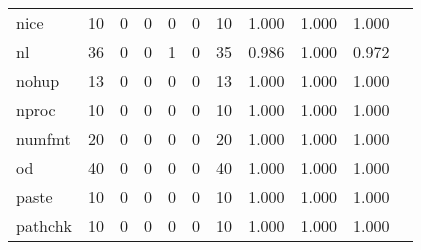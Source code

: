 \begin{longtable}{lp{1.10cm}p{1.10cm}p{1.10cm}p{1.10cm}p{1.10cm}p{1.10cm}p{1.10cm}p{1.10cm}p{1.10cm}p{1.10cm}}
nice      &                     10 &                                  0 &                                 0 &                                0 &                                 0 &                              10 &                          1.000 &                                 1.000 &                               1.000 \\
nl        &                     36 &                                  0 &                                 0 &                                1 &                                 0 &                              35 &                          0.986 &                                 1.000 &                               0.972 \\
nohup     &                     13 &                                  0 &                                 0 &                                0 &                                 0 &                              13 &                          1.000 &                                 1.000 &                               1.000 \\
nproc     &                     10 &                                  0 &                                 0 &                                0 &                                 0 &                              10 &                          1.000 &                                 1.000 &                               1.000 \\
numfmt    &                     20 &                                  0 &                                 0 &                                0 &                                 0 &                              20 &                          1.000 &                                 1.000 &                               1.000 \\
od        &                     40 &                                  0 &                                 0 &                                0 &                                 0 &                              40 &                          1.000 &                                 1.000 &                               1.000 \\
paste     &                     10 &                                  0 &                                 0 &                                0 &                                 0 &                              10 &                          1.000 &                                 1.000 &                               1.000 \\
pathchk   &                     10 &                                  0 &                                 0 &                                0 &                                 0 &                              10 &                          1.000 &                                 1.000 &                               1.000 \\

\end{longtable}
